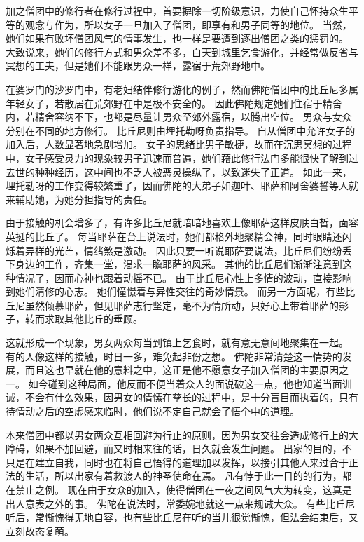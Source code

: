 \documentclass[twoside,openany]{book}
\begin{document}
加之僧团中的修行者在修行过裎中，首要摒除一切阶级意识，力使自己怀持众生平等的观念与作为，所以女子一旦加入了僧团，即享有和男子同等的地位。
当然，她们如果有败坏僧团风气的情事发生，也一样是要遭到逐出僧团之类的惩罚的。
大致说来，她们的修行方式和男众差不多，白天到城里乞食游化，并经常做反省与冥想的工夫，但是她们不能跟男众一样，露宿于荒郊野地中。

在婆罗门的沙罗门中，有老妇结伴修行游化的例子，然而佛陀僧团中的比丘尼多属年轻女子，若散居在荒郊野在中是极不安全的。
因此佛陀规定她们住宿于精舍内，若精舍容纳不下，也都是尽量让男众至郊外露宿，以腾出空位。
男众与女众分别在不同的地方修行。
比丘尼则由埋托勒呀负责指导。
自从僧团中允许女子的加入后，人数显著地急剧增加。
女子的思绪比男子敏捷，故而在沉思冥想的过程中，女子感受灵力的现象较男子迅速而普遍，她们藉此修行法门多能很快了解到过去世的种种经历，这中间也不乏人被恶灵操纵了，以致迷失了正道。
如此一来，埋托勒呀的工作变得较繁重了，因而佛陀的大弟子如迦叶、耶萨和阿舍婆誓等人就来辅助她，为她分担指导的责任。

由于接触的机会增多了，有许多比丘尼就暗暗地喜欢上像耶萨这样皮肤白晳，面容英挺的比丘了。
每当耶萨在台上说法时，她们都格外地聚精会神，同时眼睛还闪烁着异样的光芒，情绪煞是激动。
因此只要一听说耶萨要说法，比丘尼们纷纷丢下身边的工作，齐集一堂，渴求一瞻耶萨的风采。
其他的比丘尼们渐渐注意到这种情况了，因而心神也跟着动摇不已。
由于比丘尼心性上多情的波动，直接影响到她们清修的心志。
她们憧憬着与异性交往的奇妙情景。
而另一方面呢，有些比丘尼虽然倾慕耶萨，但见耶萨志行坚定，毫不为情所动，只好心上带着耶萨的影子，转而求取其他比丘的垂顾。

这就形成一个现象，男女两众每当到镇上乞食时，就有意无意间地聚集在一起。
有的人像这样的接触，时日一多，难免起非份之想。
佛陀非常清楚这一情势的发展，而且这也早就在他的意料之中，这正是他不愿意女子加入僧团的主要原因之一。
如今碰到这种局面，他反而不便当着众人的面说破这一点，他也知道当面训诫，不会有什么效果，因男女的情愫在孳长的过程中，是十分盲目而执着的，只有待情动之后的空虚感来临时，他们说不定自己就会了悟个中的道理。

本来僧团中都以男女两众互相回避为行止的原则，因为男女交往会造成修行上的大障碍，如果不加回避，而又时相来往的话，日久就会发生问题。
出家的目的，不只是在建立自我，同时也在将自己悟得的道理加以发挥，以接引其他人来过合于正法的生活，所以出家有着救渡人的神圣使命在焉。
凡有悖于此一目的的行为，都在禁止之例。
现在由于女众的加入，使得僧团在一夜之间风气大为转变，这真是出人意表之外的事。
佛陀在说法时，常委婉地就这一点来规诫大众。
有些比丘尼听后，常惭愧得无地自容，也有些比丘尼在听的当儿很觉惭愧，但法会结束后，又立刻故态复萌。
\end{document}

